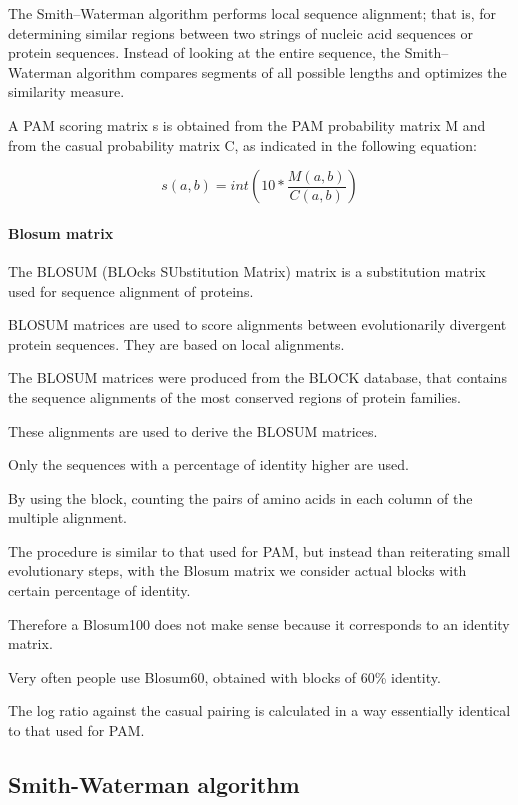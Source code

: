 The Smith–Waterman algorithm performs local sequence alignment; that is, for
determining similar regions between two strings of nucleic acid sequences or
protein sequences. Instead of looking at the entire sequence, the
Smith–Waterman algorithm compares segments of all possible lengths and
optimizes the similarity measure.

A PAM scoring matrix s is obtained from the PAM 
probability matrix M and from the casual probability 
matrix C, as indicated in the following equation:

\begin{equation}
s(a,b) = int(10*\frac{M(a,b)}{C(a,b)})
\end{equation}

\paragraph*{Blosum matrix}

The BLOSUM (BLOcks SUbstitution Matrix) matrix is a
substitution matrix used for sequence alignment of proteins. 

BLOSUM matrices are used to score alignments between evolutionarily
divergent protein sequences. They are based on local alignments. 

The BLOSUM matrices were produced from the BLOCK database, that contains
the sequence alignments of the most conserved regions of protein families.

These alignments are used to derive the BLOSUM matrices. 

Only the sequences with a percentage of identity higher are used. 

By using the block, counting the pairs of amino acids in each column of the
multiple alignment.

The procedure is similar to that used for PAM, but instead than reiterating
small evolutionary steps, with the Blosum matrix we consider actual blocks
with certain percentage of identity. 

Therefore a Blosum100 does not make sense because it corresponds to an
identity matrix.

Very often people use Blosum60, obtained with blocks of 60\% identity.

The log ratio against the casual pairing is calculated in a way essentially
identical to that used for PAM. 

\subsection{Smith-Waterman algorithm}


